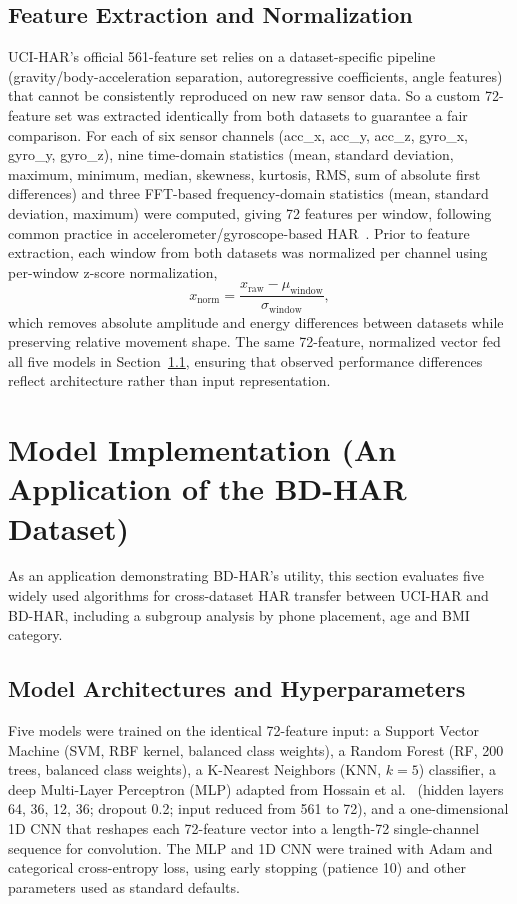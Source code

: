 \documentclass[conference]{IEEEtran}
\begin{document}
\subsection{Feature Extraction and Normalization}
\label{subsec:features}
UCI-HAR's official 561-feature set relies on a dataset-specific
pipeline (gravity/body-acceleration separation, autoregressive
coefficients, angle features) that cannot be consistently reproduced
on new raw sensor data. So a custom 72-feature set was extracted identically from both datasets to guarantee a fair comparison. For each of six sensor
channels (acc\_x, acc\_y, acc\_z, gyro\_x, gyro\_y, gyro\_z), nine
time-domain statistics (mean, standard deviation, maximum, minimum,
median, skewness, kurtosis, RMS, sum of absolute first differences)
and three FFT-based frequency-domain statistics (mean, standard
deviation, maximum) were computed, giving 72 features per window,
following common practice in accelerometer/gyroscope-based
HAR~\cite{issa_har_embedded_2022}. Prior to feature extraction, each
window from both datasets was normalized per channel using per-window
z-score normalization,
\[
x_{\text{norm}} = \frac{x_{\text{raw}} - \mu_{\text{window}}}{\sigma_{\text{window}}},
\]
which removes absolute amplitude and energy differences between
datasets while preserving relative movement shape. The same
72-feature, normalized vector fed all five models in
Section~\ref{subsec:models}, ensuring that observed performance
differences reflect architecture rather than input representation.

\section{Model Implementation (An Application of the BD-HAR Dataset)}
\label{sec:modelapp}

As an application demonstrating BD-HAR's utility, this section
evaluates five widely used algorithms for cross-dataset HAR transfer
between UCI-HAR and BD-HAR, including a subgroup analysis by phone
placement, age and BMI category.

\subsection{Model Architectures and Hyperparameters}
\label{subsec:models}
Five models were trained on the identical 72-feature input: a Support
Vector Machine (SVM, RBF kernel, balanced class weights), a Random
Forest (RF, 200 trees, balanced class weights), a K-Nearest Neighbors
(KNN, $k=5$) classifier, a deep Multi-Layer Perceptron (MLP) adapted
from Hossain et al.~\cite{hossain_enhanced_2024} (hidden layers 64,
36, 12, 36; dropout 0.2; input reduced from 561 to 72), and a
one-dimensional 1D CNN that reshapes each 72-feature vector into a
length-72 single-channel sequence for convolution. The MLP and 1D CNN
were trained with Adam and categorical cross-entropy loss, using
early stopping (patience 10) and other parameters used as standard defaults.
\end{document}
